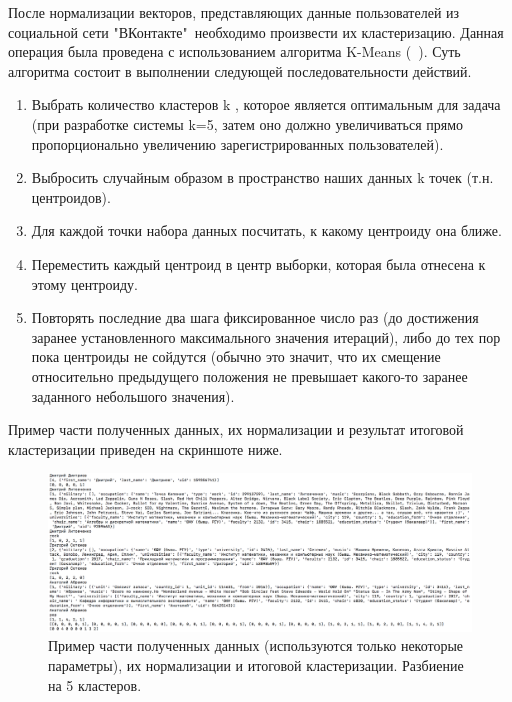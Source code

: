 После нормализации векторов, представляющих данные пользователей из социальной сети "ВКонтакте"\, необходимо произвести их кластеризацию. Данная операция была проведена с использованием алгоритма K-Means (~\autocite{intuitLessons}). Суть алгоритма состоит в выполнении следующей последовательности действий.

\begin{enumerate}
	\item Выбрать количество кластеров k
	, которое является оптимальным для задача (при разработке системы k=5, затем оно должно увеличиваться прямо пропорционально увеличению зарегистрированных пользователей).
	\item Выбросить случайным образом в пространство наших данных k точек (т.н. центроидов).
	\item Для каждой точки набора данных посчитать, к какому центроиду она ближе.
	\item Переместить каждый центроид в центр выборки, которая была отнесена к этому центроиду.
	\item Повторять последние два шага фиксированное число раз (до достижения заранее установленного максимального значения итераций), либо до тех пор пока центроиды не сойдутся (обычно это значит, что их смещение относительно предыдущего положения не превышает какого-то заранее заданного небольшого значения).
\end{enumerate}



Пример части полученных данных, их нормализации и результат итоговой кластеризации приведен на скриншоте ниже.

\begin{figure}[H]%
	\centering
	\includegraphics[width=\textwidth]{img/vk1.png}
	\caption{\label{fig:tan-aus}Пример части полученных данных (используются только некоторые параметры), их нормализации и итоговой кластеризации. Разбиение на 5 кластеров.}
\end{figure} 


